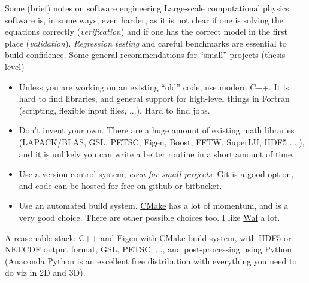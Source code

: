 \documentclass[aspectratio=169]{beamer}
\newcommand{\mypause}{\pause}
\begin{document}
\begin{frame}{Some (brief) notes on software engineering}
  \footnotesize%
  Large-scale computational physics software is, in some ways, even
  harder, as it is not clear if one is solving the equations correctly
  (\emph{verification}) and if one has the correct model in the first
  place (\emph{validation}). \emph{Regression testing} and careful
  benchmarks are essential to build confidence.
  \mypause%
  \vskip0.05in%
  Some general recommendations for ``small'' projects (thesis level)
  \begin{itemize}
  \item Unless you are working on an existing ``old'' code, use modern
    C++. It is hard to find libraries, and general support for
    high-level things in Fortran (scripting, flexible input files,
    ...). Hard to find jobs.%
    \mypause%
  \item Don't invent your own. There are a huge amount of existing
    math libraries (LAPACK/BLAS, GSL, PETSC, Eigen, Boost, FFTW,
    SuperLU, HDF5 ....), and it is unlikely you can write a better
    routine in a short amount of time.%
    \mypause%
  \item Use a version control system, \emph{even for small
      projects}. Git is a good option, and code can be hosted for free
    on github or bitbucket.%
    \mypause%
  \item Use an automated build system. \href{https://cmake.org}{CMake}
    has a lot of momentum, and is a very good choice. There are other
    possible choices too. I like \href{https://waf.io}{Waf} a lot.
  \end{itemize}
  \mypause%
  A reasonable stack: C++ and Eigen with CMake build system, with HDF5
  or NETCDF output format, GSL, PETSC, ..., and post-processing using
  Python (Anaconda Python is an excellent free distribution with
  everything you need to do viz in 2D and 3D).
\end{frame}
\end{document}

